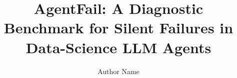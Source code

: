 \documentclass[sigconf,review]{acmart}
\title{AgentFail: A Diagnostic Benchmark for Silent Failures in Data-Science LLM Agents}
\author{Author Name}
\affiliation{%
  \institution{Institution Name}
  \country{Country}}
\begin{document}
\begin{abstract}

\end{abstract}

\maketitle












\appendix


\end{document}
